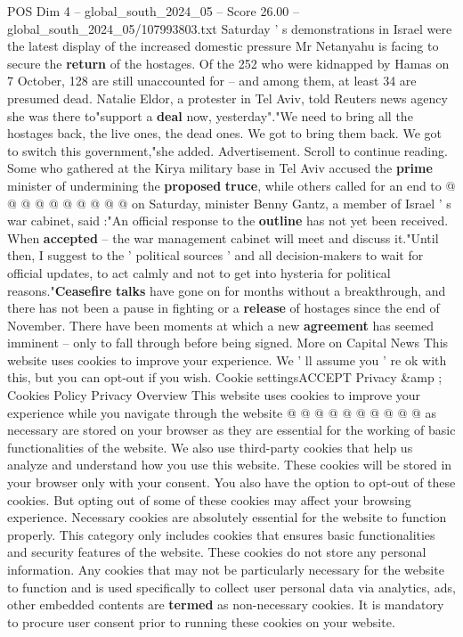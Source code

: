 \begin{textsample}{POS Dim 4 – global\_south\_2024\_05 – Score 26.00 – global\_south\_2024\_05/107993803.txt}
Saturday ' s demonstrations in Israel were the latest display of the increased domestic pressure Mr Netanyahu is facing to secure the \textbf{return} of the hostages.
Of the 252 who were kidnapped by Hamas on 7 October, 128 are still unaccounted for -- and among them, at least 34 are presumed dead.
Natalie Eldor, a protester in Tel Aviv, told Reuters news agency she was there to"support a \textbf{deal} now, yesterday"."We need to bring all the hostages back, the live ones, the dead ones.
We got to bring them back.
We got to switch this government,"she added.
Advertisement.
Scroll to continue reading.
Some who gathered at the Kirya military base in Tel Aviv accused the \textbf{prime} minister of undermining the \textbf{proposed} \textbf{truce}, while others called for an end to @ @ @ @ @ @ @ @ @ @ on Saturday, minister Benny Gantz, a member of Israel ' s war cabinet, said :"An official response to the \textbf{outline} has not yet been received.
When \textbf{accepted} -- the war management cabinet will meet and discuss it."Until then, I suggest to the ' political sources ' and all decision-makers to wait for official updates, to act calmly and not to get into hysteria for political reasons."\textbf{Ceasefire} \textbf{talks} have gone on for months without a breakthrough, and there has not been a pause in fighting or a \textbf{release} of hostages since the end of November.
There have been moments at which a new \textbf{agreement} has seemed imminent -- only to fall through before being signed.
More on Capital News This website uses cookies to improve your experience.
We ' ll assume you ' re ok with this, but you can opt-out if you wish.
Cookie settingsACCEPT Privacy \&amp ; Cookies Policy Privacy Overview This website uses cookies to improve your experience while you navigate through the website @ @ @ @ @ @ @ @ @ @ as necessary are stored on your browser as they are essential for the working of basic functionalities of the website.
We also use third-party cookies that help us analyze and understand how you use this website.
These cookies will be stored in your browser only with your consent.
You also have the option to opt-out of these cookies.
But opting out of some of these cookies may affect your browsing experience.
Necessary cookies are absolutely essential for the website to function properly.
This category only includes cookies that ensures basic functionalities and security features of the website.
These cookies do not store any personal information.
Any cookies that may not be particularly necessary for the website to function and is used specifically to collect user personal data via analytics, ads, other embedded contents are \textbf{termed} as non-necessary cookies.
It is mandatory to procure user consent prior to running these cookies on your website.

\end{textsample}
